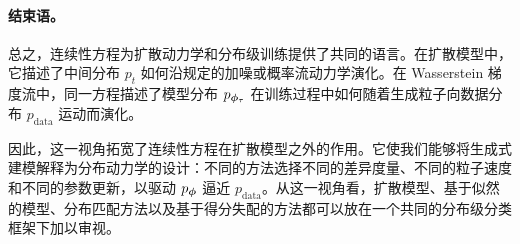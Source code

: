 \paragraph{结束语。}
总之，连续性方程为扩散动力学和分布级训练提供了共同的语言。在扩散模型中，它描述了中间分布 $p_t$ 如何沿规定的加噪或概率流动力学演化。在 Wasserstein 梯度流中，同一方程描述了模型分布 $p_{{\bm{\phi}}_\tau}$ 在训练过程中如何随着生成粒子向数据分布 $p_{\mathrm{data}}$ 运动而演化。

因此，这一视角拓宽了连续性方程在扩散模型之外的作用。它使我们能够将生成式建模解释为分布动力学的设计：不同的方法选择不同的差异度量、不同的粒子速度和不同的参数更新，以驱动 $p_{{\bm{\phi}}}$ 逼近 $p_{\mathrm{data}}$。从这一视角看，扩散模型、基于似然的模型、分布匹配方法以及基于得分失配的方法都可以放在一个共同的分布级分类框架下加以审视。



\clearpage
\newpage

